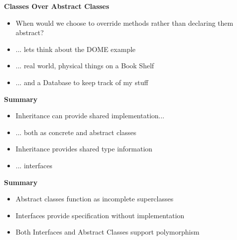 \documentclass{beamer}
\begin{document}
\begin{frame}
\begin{center}
\textbf{Classes Over Abstract Classes}
\end{center}
\begin{itemize}
\item When would we choose to override methods rather than declaring them abstract?
\bigskip
\item ... lets think about the DOME example
\item ... real world, physical things on a Book Shelf
\item ... and a Database to keep track of my stuff
\end{itemize}
\end{frame}


\begin{frame}
\begin{center}
\textbf{Summary}
\end{center}
\begin{itemize}
\item Inheritance can provide shared implementation...
\item ... both as concrete and abstract classes
\item Inheritance provides shared type information
\item ... interfaces
\end{itemize}
\end{frame}

\begin{frame}
\begin{center}
\textbf{Summary}
\end{center}
\begin{itemize}
\item Abstract classes function as incomplete superclasses
\item Interfaces provide specification without implementation
\bigskip
\item Both Interfaces and Abstract Classes support polymorphism
\end{itemize}
\end{frame}
\end{document}
